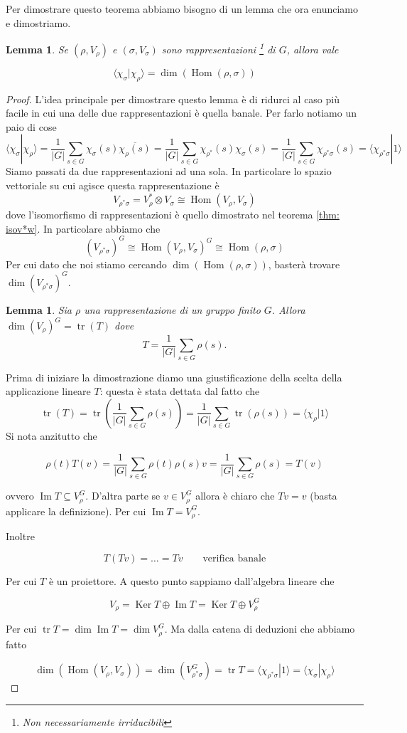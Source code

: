 \documentclass[11pt]{article}
\theoremstyle{plain}
\newtheorem{lemma}[thm]{Lemma}
\theoremstyle{definition}
\theoremstyle{remark}
\newcommand{\dsum}{\displaystyle\sum}
\DeclareMathOperator{\tr}{tr}
\DeclareMathOperator{\Hom}{Hom}
\DeclareMathOperator{\Ker}{Ker}
\DeclareMathOperator{\Imm}{Im}
\begin{document}
Per dimostrare questo teorema abbiamo bisogno di un lemma che ora enunciamo e dimostriamo.




\begin{lemma}
Se $(\rho, V_\rho)$ e $(\sigma, V_\sigma)$ sono rappresentazioni \footnote{Non necessariamente irriducibili} di $G$, allora vale

\[ \langle \chi_\sigma | \chi_\rho \rangle  = \dim(\Hom (\rho, \sigma))\]
\label{lemma relazioni ortogonalita}
\end{lemma}
\begin{proof}
L'idea principale per dimostrare questo lemma è di ridurci al caso più facile in cui una delle due rappresentazioni è quella banale. Per farlo notiamo un paio di cose
\[ \langle \chi_\sigma | \chi_\rho \rangle = \dfrac{1}{|G|} \dsum_{s\in G} \chi_\sigma(s) \overline{\chi_\rho(s)} = \dfrac{1}{|G|} \dsum_{s\in G} {\chi_{\rho^*}(s)} \chi_{\sigma}(s) = \dfrac{1}{|G|} \dsum_{s\in G} \chi_{\rho^*\sigma}(s)  = \langle \chi_{\rho^*\sigma}  | 1 \rangle\]
Siamo passati da due rappresentazioni ad una sola. In particolare lo spazio vettoriale su cui agisce questa rappresentazione è
\[ V_{\rho^* \sigma} = V_{\rho}^* \otimes V_\sigma \cong \Hom(V_\rho, V_\sigma)\]
dove l'isomorfismo di rappresentazioni è quello dimostrato nel teorema \ref{thm: isov*w}.
In particolare abbiamo che
\[ (V_{\rho^*\sigma})^G \cong \Hom(V_\rho, V_\sigma)^G \cong \Hom(\rho, \sigma)\]
Per cui dato che noi stiamo cercando $\dim(\Hom(\rho, \sigma))$, basterà trovare $\dim(V_{\rho^*\sigma})^G$.
\begin{lemma}
Sia $\rho$ una rappresentazione di un gruppo finito $G$. Allora
$\dim(V_{\rho})^G=\tr(T)$ dove
\[ T = \dfrac{1}{|G|} \dsum_{s\in G} \rho(s).\]
\end{lemma}

Prima di iniziare la dimostrazione diamo una giustificazione della scelta della applicazione lineare $T$: questa è stata dettata dal fatto che
\[ \tr(T)=\tr\left(\dfrac{1}{|G|} \dsum_{s\in G} \rho(s)\right)= \dfrac{1}{|G|} \dsum_{s\in G} \tr(\rho(s))= \langle \chi_\rho| 1 \rangle \]
Si nota anzitutto che

\[ \rho(t) T(v) = \dfrac{1}{|G|} \dsum_{s\in G} \rho(t)\rho(s) v = \dfrac{1}{|G|} \dsum_{s\in G} \rho(s) = T(v)\]

ovvero $\Imm T\subseteq V_\rho^G$. D'altra parte se $v \in V_\rho^G$ allora è chiaro che $Tv = v$ (basta applicare la definizione). Per cui $\Imm T = V_\rho^G$.

Inoltre

\[T(Tv) = \ldots = Tv \qquad \text{verifica banale}\]

Per cui $T$ è un proiettore. A questo punto sappiamo dall'algebra lineare che

\[ V_\rho = \Ker T \oplus \Imm T = \Ker T \oplus V_\rho^G\]

Per cui $\tr T = \dim \Imm T = \dim V_\rho^G$. Ma dalla catena di deduzioni che abbiamo fatto

\[\dim(\Hom(V_\rho, V_\sigma)) = \dim(V_{\rho^*\sigma}^G) = \tr T = \langle \chi_{\rho^*\sigma} | 1 \rangle = \langle \chi_\sigma | \chi_\rho \rangle\]

\end{proof}
\end{document}
